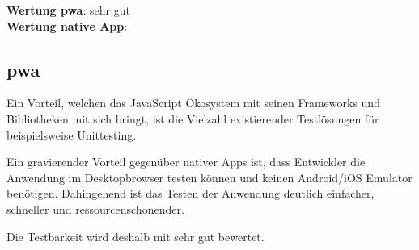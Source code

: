 \textbf{Wertung \ac{pwa}}: sehr gut\\
\textbf{Wertung native App}:  \\

\subsection{\ac{pwa}}
Ein Vorteil, welchen das JavaScript Ökosystem mit seinen Frameworks und Bibliotheken mit sich bringt, ist die Vielzahl existierender Testlösungen für beispielsweise Unittesting.

Ein gravierender Vorteil gegenüber nativer Apps ist, dass Entwickler die Anwendung im Desktopbrowser testen können und keinen Android/iOS Emulator benötigen. Dahingehend ist das Testen der Anwendung deutlich einfacher, schneller und ressourcenschonender.

Die Testbarkeit wird deshalb mit sehr gut bewertet.